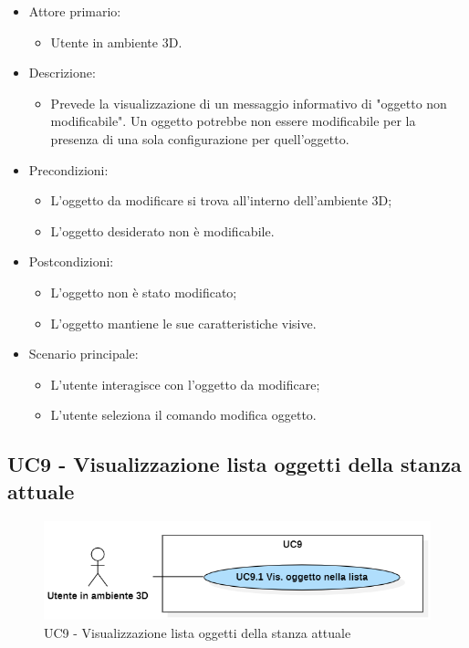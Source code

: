 \begin{itemize}

	\item Attore primario: 
	\begin{itemize}
		\item Utente in ambiente 3D.
	\end{itemize}
	\item Descrizione:
	\begin{itemize}
		\item Prevede la visualizzazione di un messaggio informativo di "oggetto non modificabile".
\newline Un oggetto potrebbe non essere modificabile per la presenza di una sola configurazione per quell'oggetto.
	\end{itemize}
	
	\item Precondizioni:
	\begin{itemize}
		\item L'oggetto da modificare si trova all'interno dell'ambiente 3D;
		\item L'oggetto desiderato non è modificabile.
	\end{itemize}
	
	\item Postcondizioni:
	\begin{itemize}
		\item L'oggetto non è stato modificato;
		\item L'oggetto mantiene le sue caratteristiche visive.
	\end{itemize}
	
	\item Scenario principale:
	\begin{itemize}
		\item L'utente interagisce con l'oggetto da modificare;
		\item L'utente seleziona il comando modifica oggetto.
	\end{itemize}
	
\end{itemize}

\pagebreak

\subsection{UC9 - Visualizzazione lista oggetti della stanza attuale}

\begin{figure}[H]
  \renewcommand{\thefigure}{11}
  \includegraphics[width=\linewidth]{./res/images/UC9.png}
  \caption{UC9 - Visualizzazione lista oggetti della stanza attuale}
  \label{fig:UC 9}
\end{figure}

